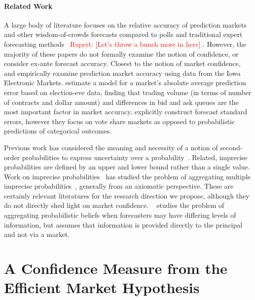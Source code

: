 \documentclass[sigconf,anonymous]{aamas}   %
\newcommand{\rupert}[1]{\ifnum\Chatty=1 \textcolor{red}   {Rupert: [#1]} \fi}
\begin{document}
\paragraph{Related Work} 
A large body of literature focuses on the relative accuracy of prediction markets and other wisdom-of-crowds forecasts compared to polls and traditional expert forecasting methods~\cite{wolfers2004prediction,wolfers2006prediction,erikson2008political,goel2010prediction} \rupert{Let's throw a bunch more in here}. However, the majority of these papers do not formally examine the notion of confidence, or consider ex-ante forecast accuracy.
Closest to the notion of market confidence, \cite{berg1997makes} and \cite{berg2003accuracy} empirically examine prediction market accuracy using data from the Iowa Electronic Markets. \cite{berg1997makes} estimate a model for a market's absolute average prediction error based on election-eve data, finding that trading volume (in terms of number of contracts and dollar amount) and differences in bid and ask queues are the most important factor in market accuracy. \cite{berg2003accuracy} explicitly construct forecast standard errors, however they focus on vote share markets as opposed to probabilistic predictions of categorical outcomes. 

Previous work has considered the meaning and necessity of a notion of second-order probabilities to express uncertainty over a probability~\cite{baron1987second,goldsmith1983role,hansson2008we,pearl1987}. Related, imprecise probabilities are defined by an upper and lower bound rather than a single value. Work on imprecise probabilities~\cite{augustin2014introduction} has studied the problem of aggregating multiple imprecise probabilities~\cite{nau2002aggregation,stewart2018probabilistic,moral1998aggregation}, generally from an axiomatic perspective. These are certainly relevant literatures for the research direction we propose, although they do not directly shed light on market confidence. \citeauthor{frongillo2015elicitation}~\cite{frongillo2015elicitation} studies the problem of aggregating probabilistic beliefs when forecasters may have differing levels of information, but assumes that information is provided directly to the principal and not via a market.


\section{A Confidence Measure from the Efficient Market Hypothesis}
\label{sec:emh}
\end{document}
